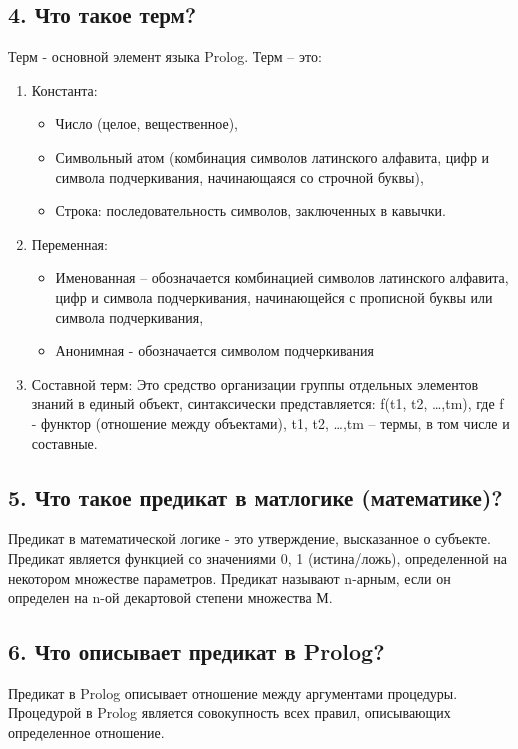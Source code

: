 \subsection*{4. Что такое терм?}

Терм - основной элемент языка Prolog. Терм – это:

\begin{enumerate}
	\item Константа: 
	\begin{itemize}
		\item Число (целое, вещественное),
		\item Символьный атом (комбинация символов латинского алфавита, цифр и символа подчеркивания, начинающаяся со строчной буквы),
		\item Строка: последовательность символов, заключенных в кавычки.
	\end{itemize}
	\item Переменная:
	\begin{itemize}
		\item Именованная – обозначается комбинацией символов латинского алфавита, цифр и символа подчеркивания, начинающейся с прописной буквы или символа подчеркивания,
		\item Анонимная  - обозначается символом подчеркивания
	\end{itemize}
	\item Составной терм:
	Это средство организации группы отдельных элементов знаний в единый  объект,  синтаксически представляется: f(t1, t2, …,tm), где f -  функтор (отношение между объектами), t1, t2, …,tm – термы, в том  числе  и составные.
\end{enumerate}

\subsection*{5. Что такое предикат в матлогике (математике)?}

Предикат в математической логике - это утверждение, высказанное о субъекте. Предикат является функцией со значениями {0, 1} (истина/ложь), определенной на некотором множестве параметров. Предикат называют n-арным, если он определен на n-ой декартовой степени множества М.

\subsection*{6. Что описывает предикат в Prolog?}

Предикат в Prolog описывает отношение между аргументами процедуры. Процедурой в Prolog является совокупность всех правил, описывающих определенное отношение.

